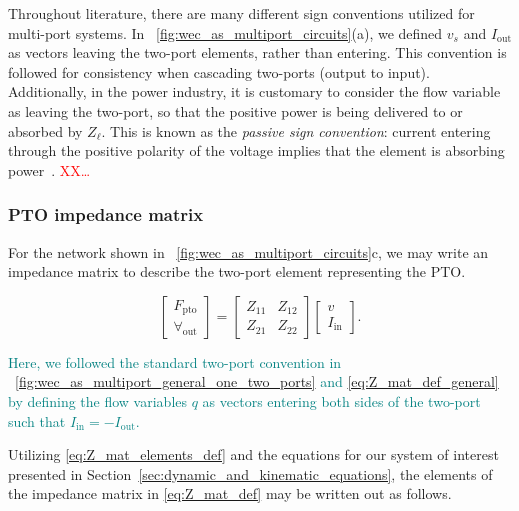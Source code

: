 \documentclass[lettersize,journal]{IEEEtran}
\newcommand{\rc}[1]{\textcolor{red}{#1}}
\newcommand{\ak}[1]{\textcolor{teal}{#1}}
\begin{document}
Throughout literature, there are many different sign conventions utilized for multi-port systems.
In \figurename~\ref{fig:wec_as_multiport_circuits}(a), we defined $v_s$ and $I_{\textrm{out}}$ as vectors leaving the two-port elements, rather than entering. 
This convention is followed for consistency when cascading two-ports (output to input). 
Additionally, in the power industry, it is customary to consider the flow variable as leaving the two-port, so that the positive power is being delivered to or absorbed by $Z_\ell$. 
This is known as the \textit{passive sign convention}: current entering through the positive polarity of the voltage implies that the element is absorbing power~\cite{CircuitFundamental}.
\rc{XX\dots}

\subsubsection{PTO impedance matrix}\label{sec:pto_impedance_matrix}

For the network shown in \figurename~\ref{fig:wec_as_multiport_circuits}c, we may write an impedance matrix to describe the two-port element representing the PTO.

\begin{equation}
        \label{eq:Z_mat_def}
        \begin{bmatrix} 
                F_{\textrm{pto}} \\
                \forall_{\textrm{out}} 
        \end{bmatrix} 
        = 
        \begin{bmatrix} 
                Z_{11} & Z_{12} \\ 
                Z_{21} & Z_{22} 
        \end{bmatrix} 
        \begin{bmatrix} 
                v \\
                I_{\textrm{in}} 
        \end{bmatrix} .
\end{equation}

\ak{Here, we followed the standard two-port convention in \figurename~\ref{fig:wec_as_multiport_general_one_two_ports} and \eqref{eq:Z_mat_def_general} by defining the flow variables $q$ as vectors entering both sides of the two-port such that $I_{\textrm{in}} = -I_{\textrm{out}}$.}

\noindent{} Utilizing \eqref{eq:Z_mat_elements_def} and the equations for our system of interest presented in Section~\ref{sec:dynamic_and_kinematic_equations}, the elements of the impedance matrix in \eqref{eq:Z_mat_def} may be written out as follows.
\end{document}
